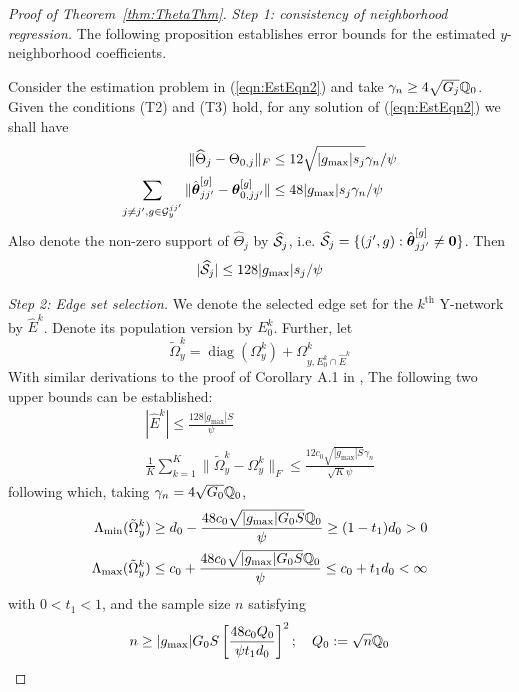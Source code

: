 \documentclass[12pt, letterpaper]{article}
\DeclareMathOperator*{\diag}{diag }
\numberwithin{equation}{section}
\begin{document}
\begin{proof}[Proof of Theorem~\ref{thm:ThetaThm}]

{\it Step 1: consistency of neighborhood regression.} The following proposition establishes error bounds for the estimated $y$-neighborhood coefficients.

\begin{Proposition}\label{prop:Thm1ProofProp2}
Consider the estimation problem in (\ref{eqn:EstEqn2}) and take $\gamma_n \geq 4 \sqrt{G_j} {\mathbb{Q}}_0$. Given the conditions (T2) and (T3) hold, for any solution of (\ref{eqn:EstEqn2}) we shall have
%
\begin{align}
\| \widehat \Theta_j - \Theta_{0,j} \|_F & \leq 12 \sqrt{|g_{\max}| s_j} \gamma_n / \psi \label{eqn:Thm1ProofProp2Bd1}\\
\sum_{j \neq j', g \in {\cal{G}}_y^{jj'}} \| \hat {{\boldsymbol{\theta}}}_{jj'}^{[g]} - {\boldsymbol{\theta}}_{0,jj'}^{[g]} \| & \leq 48 | g_{\max}| s_j \gamma_n / \psi \label{eqn:Thm1ProofProp2Bd2}
\end{align}
%
Also denote the non-zero support of $\widehat \Theta_j$ by $\widehat {{\cal{S}}}_j$, i.e. $\widehat {{\cal{S}}}_j = \{ (j',g): \hat {{\boldsymbol{\theta}}}_{jj'}^{[g]} \neq {\bf 0} \}$. Then
%
\begin{align}
| \widehat {{\cal{S}}}_j| \leq 128 | g_{\max}| s_j / \psi \label{eqn:Thm1ProofProp2Bd3}
\end{align}
\end{Proposition}

{\it Step 2: Edge set selection.} We denote the selected edge set for the $k^\text{th}$ Y-network by $\hat E^k$. Denote its population version by $E_0^k$. Further, let
%
$$
\tilde \Omega_y^k = \diag (\Omega_y^k) + \Omega_{y, E_0^k \cap \hat E^k}^k
$$
%
With similar derivations to the proof of Corollary A.1 in \cite{MaMichailidis15}, The following two upper bounds can be established:
%
\begin{align}
| \hat E^k | \leq \frac{ 128 | g_{\max} | S }{\psi} \label{eqn:Thm1ProofProp2Bd4}\\
\frac{1}{K} \sum_{k=1}^K \| \tilde \Omega_y^k - \Omega_y^k \|_F \leq
\frac{12 c_0 \sqrt{| g_{\max}| S} \gamma_n} {\sqrt K \psi} 
\end{align}
%
following which, taking $\gamma_n = 4 \sqrt{G_0} {\mathbb{Q}}_0$,
%
\begin{align}
\Lambda_{\min} ( \tilde \Omega_y^k) \geq d_0 - \frac{48 c_0 \sqrt{| g_{\max}| G_0 S} {\mathbb{Q}}_0}{ \psi} \geq (1 - t_1) d_0 > 0\\
\Lambda_{\max} ( \tilde \Omega_y^k) \leq c_0 + \frac{48 c_0 \sqrt{| g_{\max}| G_0 S} {\mathbb{Q}}_0}{ \psi} \leq c_0 + t_1 d_0 < \infty \label{eqn:Thm1ProofProp2Bd5}
\end{align}
%
with $0 < t_1 < 1$, and the sample size $n$ satisfying
%
$$
n \geq | g_{\max}| G_0 S \left[ \frac{48 c_0 Q_0}{\psi t_1 d_0} \right]^2; \quad Q_0 := \sqrt n {\mathbb{Q}}_0
$$


\end{proof}
\end{document}
